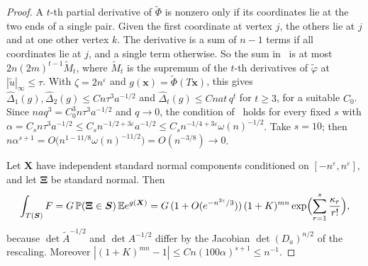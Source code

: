 \documentclass[11pt]{article}
\newcommand{\EE}{\mathbb{E}}
\newcommand{\PP}{\mathbb{P}}
\begin{document}
\begin{proof}
A \(t\)-th partial derivative of \(\tilde\Phi\) is nonzero only if its coordinates lie at
the two ends of a single pair. Given the first coordinate at vertex \(j\), the
others lie at \(j\) and at one other vertex \(k\). The derivative is a sum of
\(n-1\) terms if all coordinates lie at \(j\), and a single term otherwise.
So the sum in~\cite[Lemma~2.7]{IM25} is at most \(2n(2m)^{t-1}\tilde M_t\), where
\(\tilde M_t\) is the supremum of the \(t\)-th derivatives of \(\tilde\varphi\) at
\(|\tilde u|_\infty\le\tau\).
With \(\zeta=2n^\varepsilon\) and \(g(\boldsymbol x)=\tilde\Phi(T\boldsymbol x)\), this gives
\(\widehat\Delta_1(g),\widehat\Delta_2(g)\le Cn\tau^3a^{-1/2}\) and
\(\widehat\Delta_t(g)\le Cnat\,q^t\) for \(t\ge3\), for a suitable \(C_0\).
Since \(naq^3=C_0^3n\tau^3a^{-1/2}\) and \(q\to0\), the condition
of~\cite[Theorem~2.6]{IM25} holds for every fixed \(s\) with
\(\alpha=C_sn\tau^3a^{-1/2}\le C_sn^{-1/2+3\varepsilon}a^{-1/2}
\le C_sn^{-1/4+3\varepsilon}\omega(n)^{-1/2}\).
Take \(s=10\); then
\(n\alpha^{s+1}=O\bigl(n^{1-11/8}\omega(n)^{-11/2}\bigr)=O(n^{-3/8})\to0\).

Let \(\boldsymbol X\) have independent standard normal components conditioned on
\([-n^\varepsilon,n^\varepsilon]\), and let \(\boldsymbol\Xi\) be standard normal. Then
\[
\int_{T(\boldsymbol S)}F=G\,\PP(\boldsymbol\Xi\in\boldsymbol S)\,\EE e^{g(\boldsymbol X)}
=G\,(1+O(e^{-n^{2\varepsilon}/3}))\,(1+K)^{mn}\exp\Bigl(\sum_{r=1}^s\frac{\kappa_r}{r!}\Bigr),
\]
because \(\det\tilde A^{-1/2}\) and \(\det A^{-1/2}\) differ by the Jacobian
\(\det(D_a)^{n/2}\) of the rescaling. Moreover
\(|(1+K)^{mn}-1|\le Cn(100\alpha)^{s+1}\le n^{-1}\).


\end{proof}
\end{document}
